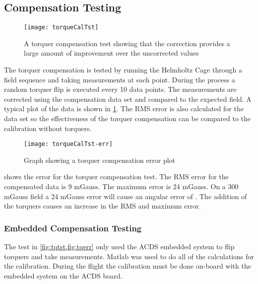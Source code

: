 \subsection{Compensation Testing}

\begin{figure}[!ht]
    \centering
    \texttt{[image: torqueCalTst]}
  \caption{A torquer compensation test showing that the correction provides a large amount of improvement over the uncorrected values}
    \label{fig:tqtst}
\end{figure}

The torquer compensation is tested by running the Helmholtz Cage through a field sequence and taking measurements at each point. During the process a random torquer flip is executed every 10 data points. The measurements are corrected using the compensation data set and compared to the expected field. A typical plot of the data is shown in \cref{fig:tqtst}. The RMS error is also calculated for the data set so the effectiveness of the torquer compensation can be compared to the calibration without torquers.

\begin{figure}[!ht]
    \centering
    \texttt{[image: torqueCalTst-err]}
    \caption{Graph showing a torquer compensation error plot}
    \label{fig:tqerr}
\end{figure}

 shows the error for the torquer compensation test. The RMS error for the compensated data is 9 mGauss. The maximum error is 24 mGauss. On a 300 mGauss field a 24 mGauss error will cause an angular error of \textdegree. The addition of the torquers causes an increase in the RMS and maximum error.


\subsubsection{Embedded Compensation Testing}

The test in \cref{fig:tqtst,fig:tqerr} only used the \ac{ACDS} embedded system to flip torquers and take measurements. Matlab was used to do all of the calculations for the calibration. During the flight the calibration must be done on-board with the embedded system on the \ac{ACDS} board.

